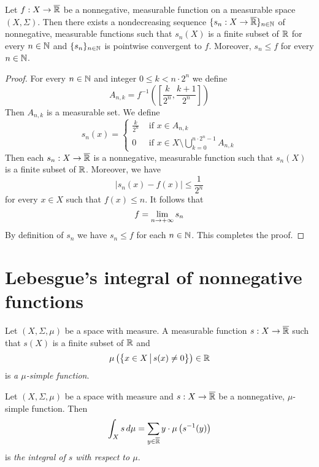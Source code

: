 \begin{proposition}\label{proposition:simple_approximation_for_nonnegative}
    Let $f:X\rightarrow \overline{{\mathbb R}}$ be a nonnegative, measurable function on a measurable space $(X,\Sigma)$. Then there exists a nondecreasing sequence $\{s_n:X\rightarrow \overline{{\mathbb R}}\}_{n\in {\mathbb N}}$ of nonnegative, measurable functions such that $s_n(X)$ is a finite subset of ${\mathbb R}$ for every $n\in {\mathbb N}$ and $\{s_n\}_{n\in {\mathbb N}}$ is pointwise convergent to $f$. Moreover, $s_n\leq f$ for every $n\in {\mathbb N}$.
\end{proposition}
\begin{proof}
    For every $n\in {\mathbb N}$ and integer $0 \leq k < n\cdot 2^n$ we define
    $$A_{n,k}=f^{-1}\left(\left[\frac{k}{2^n},\frac{k+1}{2^n}\right]\right)$$
    Then $A_{n,k}$ is a measurable set. We define
    $$s_n(x)=\begin{cases}\frac{k}{2^n} & \mbox{ if } x\in A_{n,k}                                        \\
             0             & \mbox{ if } x\in X\setminus \bigcup_{k=0}^{n\cdot 2^n-1}A_{n,k}
        \end{cases}$$
    Then each $s_n:X\rightarrow \overline{{\mathbb R}}$ is a nonnegative, measurable function such that $s_n(X)$ is a finite subset of ${\mathbb R}$. Moreover, we have
    $$|s_n(x) - f(x)| \leq \frac{1}{2^n}$$
    for every $x \in X$ such that $f(x) \leq n$. It follows that
    $$f = \lim_{n\rightarrow +\infty}s_n$$
    By definition of $s_n$ we have $s_n \leq f$ for each $n\in {\mathbb N}$. This completes the proof.
\end{proof}

\section{Lebesgue's integral of nonnegative functions}\label{section:lebesgues_integration}

\begin{definition}
    Let $(X,\Sigma,\mu)$ be a space with measure. A measurable function $s:X\rightarrow \overline{{\mathbb R}}$ such that $s(X)$ is a finite subset of ${\mathbb R}$ and
    $$\mu\left(\big\{x\in X\,\big|\,s(x)\neq 0\big\}\right) \in {\mathbb R}$$
    is \textit{a $\mu$-simple function}.
\end{definition}

\begin{definition}
    Let $(X,\Sigma,\mu)$ be a space with measure and $s:X\rightarrow \overline{{\mathbb R}}$ be a nonnegative, $\mu$-simple function. Then
    $$\int_Xs\,d\mu = \sum_{y\in \overline{{\mathbb R}}}y\cdot \mu\left(s^{-1}(y)\right)$$
    is \textit{the integral of $s$ with respect to $\mu$}.
\end{definition}

